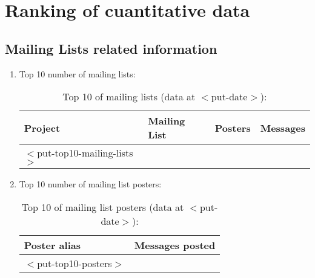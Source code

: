 \documentclass[a4paper,11pt]{report}
\begin{document}

    \newpage
    \section {Ranking of cuantitative data}

        \subsection {Mailing Lists related information}
            \begin{enumerate}

                \item Top 10 number of mailing lists:

                    \begin{table}[h]
                        \begin{center}
                            \caption{\label{TopMailingLists} Top 10 of mailing
                                        lists (data at  $<$put-date$>$):}
                            \begin{tabular}[t]{|l|l|c|c|}
                                \hline
                                \textbf{Project} & \textbf{Mailing List} & \textbf{Posters} & \textbf{Messages} \\
                                \hline
$<$put-top10-mailing-lists$>$
                            \end{tabular}
                        \end{center}
                    \end{table}



                \item Top 10 number of mailing list posters:

                    \begin{table}[h]
                        \begin{center}
                            \caption{\label{TopPosters} Top 10 of mailing list posters  (data at  $<$put-date$>$):}
                            \begin{tabular}[t]{|l|c|}
                                \hline
                                \textbf{Poster alias} & \textbf{Messages posted}\\
                                \hline
$<$put-top10-posters$>$
                            \end{tabular}
                        \end{center}
                    \end{table}

            \end{enumerate}
\end{document}
